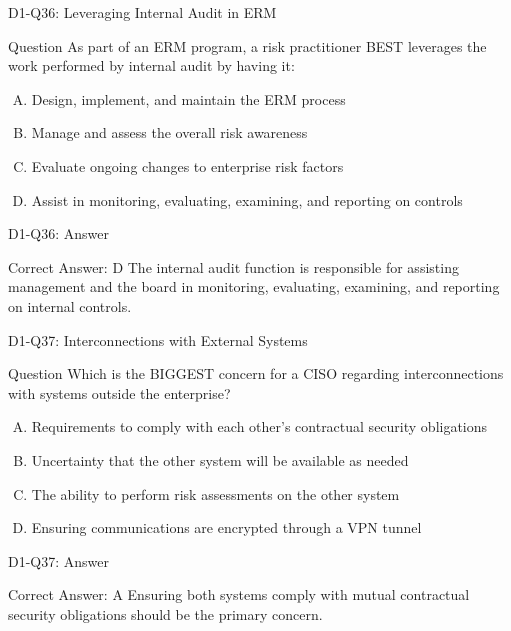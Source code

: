 \documentclass{beamer}
\begin{document}
	\begin{frame}{D1-Q36: Leveraging Internal Audit in ERM}
		\begin{block}{Question}
			As part of an ERM program, a risk practitioner BEST leverages the work performed by internal audit by having it:
		\end{block}
		\begin{enumerate}[(A)]
			\item Design, implement, and maintain the ERM process
			\item Manage and assess the overall risk awareness
			\item Evaluate ongoing changes to enterprise risk factors
			\item Assist in monitoring, evaluating, examining, and reporting on controls
		\end{enumerate}
	\end{frame}
	\begin{frame}{D1-Q36: Answer}
		\begin{block}{Correct Answer: D}
			The internal audit function is responsible for assisting management and the board in monitoring, evaluating, examining, and reporting on internal controls.
		\end{block}
	\end{frame}
	
	\begin{frame}{D1-Q37: Interconnections with External Systems}
		\begin{block}{Question}
			Which is the BIGGEST concern for a CISO regarding interconnections with systems outside the enterprise?
		\end{block}
		\begin{enumerate}[(A)]
			\item Requirements to comply with each other's contractual security obligations
			\item Uncertainty that the other system will be available as needed
			\item The ability to perform risk assessments on the other system
			\item Ensuring communications are encrypted through a VPN tunnel
		\end{enumerate}
	\end{frame}
	\begin{frame}{D1-Q37: Answer}
		\begin{block}{Correct Answer: A}
			Ensuring both systems comply with mutual contractual security obligations should be the primary concern.
		\end{block}
	\end{frame}
	
\end{document}
